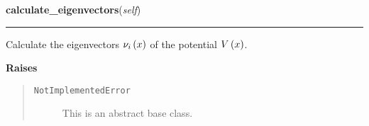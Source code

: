     \vspace{0.5ex}

\hspace{.8\funcindent}\begin{boxedminipage}{\funcwidth}

    \raggedright \textbf{calculate\_eigenvectors}(\textit{self})

    \vspace{-1.5ex}

    \rule{\textwidth}{0.5\fboxrule}
\setlength{\parskip}{2ex}
    Calculate the eigenvectors $\nu_i\left( x \right)$ of the
    potential $V\left( x \right)$.

\setlength{\parskip}{1ex}
      \textbf{Raises}
    \vspace{-1ex}

      \begin{quote}
        \begin{description}

          \item[\texttt{NotImplementedError}]

          This is an abstract base class.

        \end{description}

      \end{quote}

    \end{boxedminipage}

    \label{MatrixPotential:MatrixPotential:evaluate_eigenvectors_at}

    \vspace{0.5ex}

